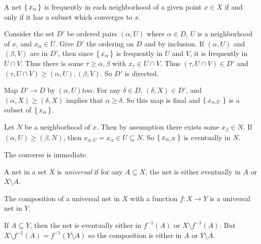 \documentclass[letterpaper, 11pt, oneside]{book}
\begin{document}
\begin{prop}
  A net $\set{x_{\alpha}}$ is frequently in each neighborhood of a given point $x \in X$ if and only if it has a subnet which converges to $x$.
\end{prop}
\begin{pf}
  Consider the set $D'$ be ordered pairs $(\alpha, U)$ where $\alpha \in D$, $U$ is a neighborhood of $x$, and $x_{\alpha} \in U$.
  Give $D'$ the ordering on $D$ and by inclusion.
  If $(\alpha, U)$ and $(\beta, V)$ are in $D'$, then since $\set{x_{\alpha}}$ is frequently in $U$ and $V$, it is frequently in $U \cap V$.
  Thus there is some $\tau \geq \alpha, \beta$ with $x_{\tau} \in U \cap V$.
  Thus $(\tau, U \cap V) \in D'$ and $(\tau, U \cap V) \geq (\alpha, U), (\beta, V)$.
  So $D'$ is directed.

  Map $D' \to D$ by $(\alpha, U) to \alpha$.
  For any $\delta \in D$, $(\delta, X) \in D'$, and $(\alpha, X) \geq (\delta, X)$ implies that $\alpha \geq \delta$.
  So this map is final and $\set{x_{\alpha, U}}$ is a subset of $\set{x_{\alpha}}$.

  Let $N$ be a neighborhood of $x$.
  Then by assumption there exists some $x_{\beta} \in N$.
  If $(\alpha, U) \geq (\beta, N)$, then $x_{\alpha, U} = x_{\alpha} \in U \subseteq N$.
  So $\set{x_{\alpha, N}}$ is eventually in $N$.

  The converse is immediate.
\end{pf}

\begin{defn}
  A net in a set $X$ is \emph{universal} if for any $A \subseteq X$, the net is either eventually in $A$ or $X \setminus A$.
\end{defn}

\begin{prop}\label{prop: composition_with_universal_is_universal}
  The composition of a universal net in $X$ with a function $f\colon X \to Y$ is a universal net in $Y$.
\end{prop}
\begin{pf}
  If $A \subseteq Y$, then the net is eventually either in $f^{-1}(A)$ or $X \setminus f^{-1}(A)$.
  But $X \setminus f^{-1}(A) = f^{-1}(Y \setminus A)$ so the composition is either in $A$ or $Y \setminus A$.
\end{pf}

\clearpage
\end{document}
